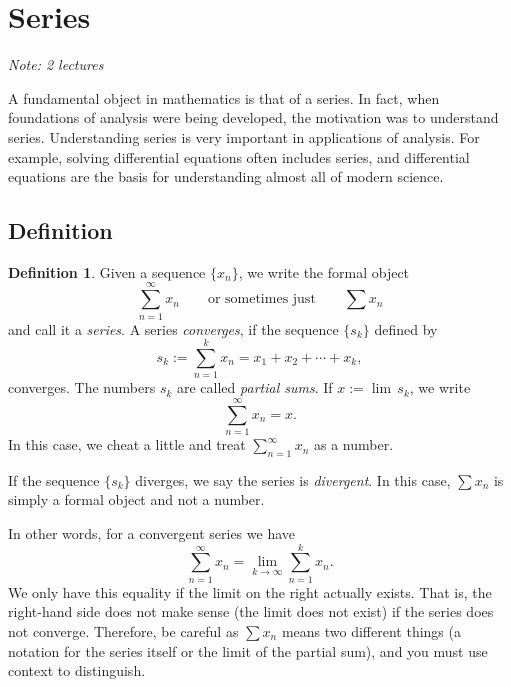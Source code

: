 \documentclass[12pt]{book}
\newcommand{\myindex}[1]{#1\index{#1}}
\newcommand{\sectionnotes}[1]{\noindent \emph{Note: #1} \medskip \par}
\newcommand{\sectionnewpage}{\clearpage}
\theoremstyle{plain}
\theoremstyle{remark}
\theoremstyle{definition}
\newtheorem{defn}[thm]{Definition}
\theoremstyle{exercise}
\theoremstyle{example}
\begin{document}
\sectionnewpage
\section{Series}
\label{sec:series}

\sectionnotes{2 lectures}

A fundamental object in mathematics is that of a series.  In fact, when
foundations of analysis were being developed, the motivation was to
understand series.  Understanding series is very important in applications
of analysis.  For example, solving differential equations often includes
series, and differential equations are the basis for understanding
almost all of modern science.

\subsection{Definition}

\begin{defn}
Given a sequence $\{ x_n \}$, we write the formal object
\begin{equation*}
\sum_{n=1}^\infty x_n
\qquad
\text{or sometimes just}
\qquad
\sum x_n
\end{equation*}
and call it a \emph{\myindex{series}}.  A series
\emph{converges}, if the sequence $\{ s_k \}$
defined by
\begin{equation*}
s_k := \sum_{n=1}^k x_n = x_1 + x_2 + \cdots + x_k ,
\end{equation*}
converges.
The numbers $s_k$ are called
\emph{\myindex{partial sums}}.
If $x := \lim\, s_k$, we write
\begin{equation*}
\sum_{n=1}^\infty x_n =  x .
\end{equation*}
In this case, we cheat a little and treat
$\sum_{n=1}^\infty x_n$ as a number.

If the sequence $\{ s_k \}$ diverges,
we say the series is \emph{divergent}.
In this case, $\sum x_n$ is simply a formal object and not a number.
\end{defn}

In other words, for a convergent series we have
\begin{equation*}
\sum_{n=1}^\infty x_n
=
\lim_{k\to\infty} 
\sum_{n=1}^k x_n .
\end{equation*}
We only have this equality if the limit on
the right actually exists.  That is, the right-hand side does not make
sense (the limit does not exist) if the series does not converge.
Therefore, be careful as 
$\sum x_n$ means two different things (a notation for the series itself 
or the limit of the partial sum), and you must use context
to distinguish.
\end{document}

